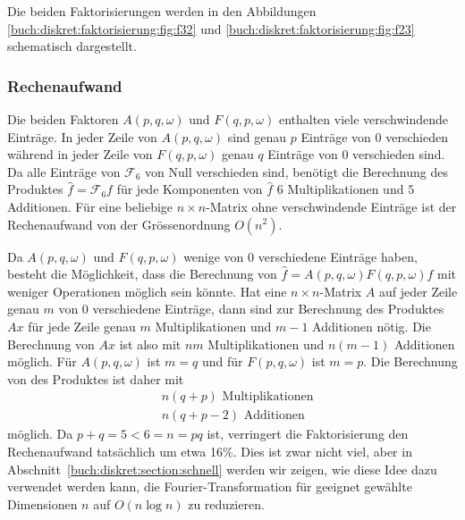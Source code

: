Die beiden Faktorisierungen werden in den Abbildungen
\ref{buch:diskret:faktorisierung:fig:f32}
und
\ref{buch:diskret:faktorisierung:fig:f23}
schematisch dargestellt.


%
%
\subsubsection{Rechenaufwand}
Die beiden Faktoren $A(p,q,\omega)$ und $F(q,p,\omega)$ enthalten
viele verschwindende Einträge.
In jeder Zeile von $A(p,q,\omega)$ sind genau $p$ Einträge von
$0$ verschieden während in jeder Zeile von $F(q,p,\omega)$ genau
$q$ Einträge von $0$ verschieden sind.
Da alle Einträge von $\mathscr{F}_6$ von Null verschieden sind, benötigt
die Berechnung des Produktes $\hat{f}=\mathscr{F}_6f$ für jede
Komponenten von $\hat{f}$ $6$ Multiplikationen und $5$ Additionen.
Für eine beliebige $n\times n$-Matrix ohne verschwindende Einträge
ist der Rechenaufwand von der Grössenordnung $O(n^2)$.

Da $A(p,q,\omega)$ und $F(q,p,\omega)$ wenige von $0$ verschiedene
Einträge haben, besteht die Möglichkeit, dass die Berechnung
von $\hat{f}=A(p,q,\omega)F(q,p,\omega)f$ mit weniger Operationen
möglich sein könnte.
Hat eine $n\times n$-Matrix $A$ auf jeder Zeile genau $m$ von $0$
verschiedene Einträge, dann sind zur Berechnung des Produktes $Ax$
für jede Zeile genau $m$ Multiplikationen und $m-1$ Additionen
nötig.
Die Berechnung von $Ax$ ist also mit $nm$ Multiplikationen und 
$n(m-1)$ Additionen möglich.
Für $A(p,q,\omega)$ ist $m=q$ und für $F(p,q,\omega)$ ist $m=p$.
Die Berechnung von des Produktes ist daher mit
\begin{align*}
&n(q+p)\text{ Multiplikationen}
\\
&n(q+p-2)\text{ Additionen}
\end{align*}
möglich.
Da $p+q=5<6=n=pq$ ist, verringert die Faktorisierung den Rechenaufwand
tatsächlich um etwa 16\%.
Dies ist zwar nicht viel, aber in Abschnitt~\ref{buch:diskret:section:schnell}
werden wir zeigen, wie diese Idee dazu verwendet werden kann, die
Fourier-Transformation für geeignet gewählte Dimensionen $n$ auf
$O(n\log n)$ zu reduzieren.

